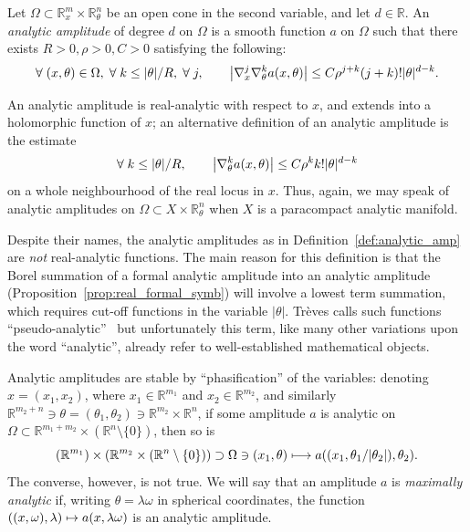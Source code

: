 \documentclass[AHL,Unicode,longabstracts,published]{cedram}
\newcommand\1{\mathds{1}}
\newcommand{\R}{\mathbb{R}}
\let\oldforall\forall
\renewcommand*{\forall}{\mathrel{\oldforall}}
\let\oldmapsto\mapsto
\renewcommand*{\mapsto}{\mathchoice{\longmapsto}{\oldmapsto}{\oldmapsto}{\oldmapsto}}
\let\originalleft\left
\let\originalright\right
\renewcommand{\left}{\mathopen{}\mathclose\bgroup\originalleft}
\renewcommand{\right}{\aftergroup\egroup\originalright}
\begin{document}
\begin{defi}\label{def:analytic_amp}
Let $\Omega\subset \R^m_x\times \R^n_{\theta}$ be an open cone in the second variable, and let $d\in \R$. An \emph{analytic amplitude} of degree $d$ on $\Omega$ is a smooth function $a$ on $\Omega$ such that there exists $R>0,\rho>0,C>0$ satisfying the following:
\[
\forall (x,\theta)\in \Omega,\;\forall k\leq |\theta|/R,\;\forall j,\qquad \left|\nabla_{x}^j\nabla_{\theta}^ka(x,\theta)\right|\leq C\rho^{j+k}(j+k)!|\theta|^{d-k}.
\]
\end{defi}

An analytic amplitude is real-analytic with respect to $x$, and extends into a holomorphic function of $x$; an alternative definition of an analytic amplitude is the estimate
\[
\forall k \leq |\theta|/R,\qquad \left|\nabla_{\theta}^ka(x,\theta)\right|\leq C\rho^kk!|\theta|^{d-k}
\]
on a whole neighbourhood of the real locus in $x$. Thus, again, we may speak of analytic amplitudes on $\Omega\subset X\times \R^n_{\theta}$ when $X$ is a paracompact analytic manifold.

\begin{rema}\label{rem:name_analytic_ampl}
Despite their names, the analytic amplitudes as in Definition~\ref{def:analytic_amp} are \emph{not} real-analytic functions. The main reason for this definition is that the Borel summation of a formal analytic amplitude into an analytic amplitude (Proposition~\ref{prop:real_formal_symb}) will involve a lowest term summation, which requires cut-off functions in the variable $|\theta|$. Trèves calls such functions ``pseudo-analytic''~\cite{treves_analytic_2022} but unfortunately this term, like many other variations upon the word ``analytic'', already refer to well-established mathematical objects.
\end{rema}

Analytic amplitudes are stable by ``phasification'' of the variables: denoting $x=(x_1,x_2)$, where $x_1\in \R^{m_1}$ and $x_2\in \R^{m_2}$, and similarly $\R^{m_2+n}\ni \theta=(\theta_1,\theta_2)\ni \R^{m_2}\times \R^n$, if some amplitude $a$ is analytic on $\Omega\subset \R^{m_1+m_2}\times (\R^{n}\setminus \{0\})$, then so is
\[
(\R^{m_1})\times (\R^{m_2}\times (\R^n\setminus \{0\}))\supset
\Omega \ni (x_1,\theta)\mapsto a((x_1,\theta_1/|\theta_2|),\theta_2).
\]
The converse, however, is not true. We will say that an amplitude $a$ is \emph{maximally analytic} if, writing $\theta=\lambda\omega$ in spherical coordinates, the function $((x,\omega),\lambda)\mapsto a(x,\lambda\omega)$ is an analytic amplitude.
\end{document}
